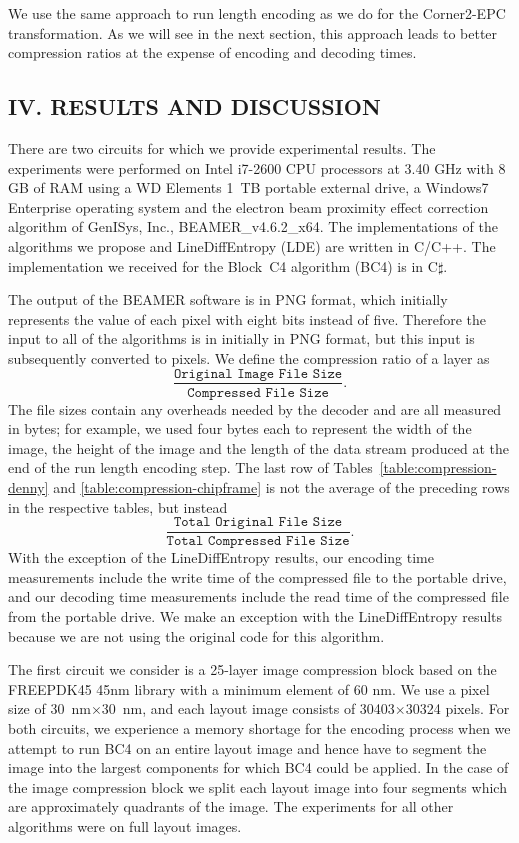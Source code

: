 \documentclass{article}
\begin{document}
We use the same approach to run length encoding as we do for the Corner2-EPC
transformation.  As we will see in the next section, this approach leads to
better compression ratios at the expense of encoding and decoding times.

\subsection*{IV. RESULTS AND DISCUSSION}
There are two circuits for which we provide experimental results.
The experiments were performed on Intel i7-2600 CPU 
processors at 3.40 GHz with 8 GB of RAM using a WD Elements 1~TB portable
external drive, a Windows7 Enterprise operating
system and the electron beam proximity effect correction algorithm of 
GenISys, Inc., {\small BEAMER}\_v4.6.2\_x64.  
The implementations of the algorithms we propose and LineDiffEntropy (LDE)
are written in C/C++.  The implementation we received for the Block~C4
algorithm (BC4) is in C$\sharp$.

The output of the {\small BEAMER} software is in PNG format, which
initially represents the value of each pixel with eight bits instead of five.
Therefore the input to all of the algorithms is in initially in 
PNG format, but this input is subsequently converted to pixels.
We define the compression ratio of a layer as
 $$\frac{\texttt{Original Image File Size}}{\texttt{Compressed File Size}}.$$ 
The file sizes contain any overheads needed by the decoder and are all
measured in bytes; for example,
we used four bytes each to represent the width of the image, the height of the
image and the length of the data stream produced at the end of the
run length encoding step.
The last row of Tables~\ref{table:compression-denny} 
and \ref{table:compression-chipframe} 
is not the average of the preceding rows in the respective tables, but instead
$$\frac{\texttt{Total Original File Size}
}{\texttt{Total Compressed File Size}}.$$
With the exception of the LineDiffEntropy results, our encoding time 
measurements include the write time of the compressed file to the portable drive,
and our decoding time measurements include the read time of the compressed file
from 
the portable drive.  We make an exception with the LineDiffEntropy results
because we are not using the original code for this algorithm.

The first circuit we consider is a 25-layer image compression block based on 
the FREEPDK45 45nm library with a minimum element of 60 nm.  
We use a pixel size of 30~nm$\times$30~nm, and each layout image consists of
30403$\times$30324 pixels.
For both circuits, we experience a memory shortage for the encoding 
process when we attempt to run BC4 on an entire layout
image and hence have to segment the image into the largest components for 
which BC4 could be applied. 
In the case  of the image compression block
we split each layout image into four segments which are 
approximately quadrants of the image.
The experiments for all other algorithms were on full layout images.  
\end{document}
